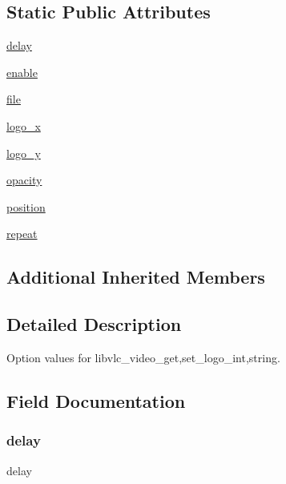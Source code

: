 \subsection*{Static Public Attributes}
\begin{DoxyCompactItemize}
\item 
\hyperlink{classvlc_1_1_video_logo_option_a5b1f6f1eaa44ff5c4f80c23687f4f324}{delay}
\item 
\hyperlink{classvlc_1_1_video_logo_option_a5fe06eea33056a543f2b9e11be097dc9}{enable}
\item 
\hyperlink{classvlc_1_1_video_logo_option_a40a5d58ffa6e88aa578d6683ac413105}{file}
\item 
\hyperlink{classvlc_1_1_video_logo_option_ae65a9e23452aadf3ef85e85ff7b4ee55}{logo\+\_\+x}
\item 
\hyperlink{classvlc_1_1_video_logo_option_a8d13520921007e38143cd181f21ec127}{logo\+\_\+y}
\item 
\hyperlink{classvlc_1_1_video_logo_option_ab54777f5b6dd2d6f7749d990817f3052}{opacity}
\item 
\hyperlink{classvlc_1_1_video_logo_option_a7130b1618285588513fd1ff97884b9d9}{position}
\item 
\hyperlink{classvlc_1_1_video_logo_option_ac00f64e7ae9c4cbe2575af8554c4401d}{repeat}
\end{DoxyCompactItemize}
\subsection*{Additional Inherited Members}


\subsection{Detailed Description}
\begin{DoxyVerb}Option values for libvlc_video_{get,set}_logo_{int,string}.
\end{DoxyVerb}
 

\subsection{Field Documentation}
\mbox{\label{classvlc_1_1_video_logo_option_a5b1f6f1eaa44ff5c4f80c23687f4f324}} 
\subsubsection{\texorpdfstring{delay}{delay}}
{\footnotesize\ttfamily delay\hspace{0.3cm}{\ttfamily [static]}}

